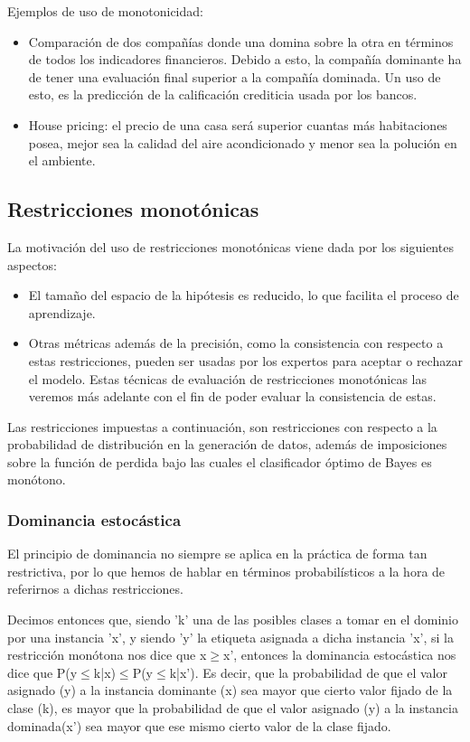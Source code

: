 Ejemplos de uso de monotonicidad: \cite{ref15}
\begin{itemize}
	\item Comparación de dos compañías donde una domina sobre la otra en términos de
	todos los indicadores financieros. Debido a esto, la compañía dominante
	ha de tener una evaluación final superior a la compañía dominada. Un uso
	de esto, es la predicción de la calificación crediticia usada por los bancos.
	\item House pricing: el precio de una casa será superior cuantas más habitaciones
	posea, mejor sea la calidad del aire acondicionado y menor sea la polución
	en el ambiente.
\end{itemize}



\subsection{Restricciones monotónicas}

La motivación del uso de restricciones monotónicas viene dada por los siguientes aspectos:
\begin{itemize}
	\item El tamaño del espacio de la hipótesis es reducido, lo que facilita el
	proceso de aprendizaje. 
	\item Otras métricas además de la precisión, como la consistencia con respecto
	a estas restricciones, pueden ser usadas por los expertos para aceptar
	o rechazar el modelo. Estas técnicas de evaluación de restricciones
	monotónicas las veremos más adelante con el fin de poder evaluar 
	la consistencia de estas.
\end{itemize}

Las restricciones impuestas a continuación, son restricciones con respecto a la probabilidad de distribución en la generación de 
datos, además de imposiciones sobre la función de perdida bajo las cuales
el clasificador óptimo de Bayes es monótono.

\subsubsection{Dominancia estocástica}

El principio de dominancia no siempre
se aplica en la práctica de forma tan restrictiva, por lo que hemos de 
hablar en términos probabilísticos a la hora de referirnos a dichas
restricciones.

Decimos entonces que, siendo 'k' una de las posibles clases a tomar en el 
dominio por una instancia 'x', y siendo 'y' la etiqueta asignada a dicha
instancia 'x', si la restricción monótona nos dice que x$\ge$x', entonces
la dominancia estocástica nos dice que P(y$\le$k|x)$\le$P(y$\le$k|x').
Es decir, que la probabilidad de que el valor asignado (y) a la instancia 
dominante (x) sea mayor que cierto valor fijado de la clase (k), es mayor
que la probabilidad de que el valor asignado (y) a la instancia dominada(x')
sea mayor que ese mismo cierto valor de la clase fijado.

